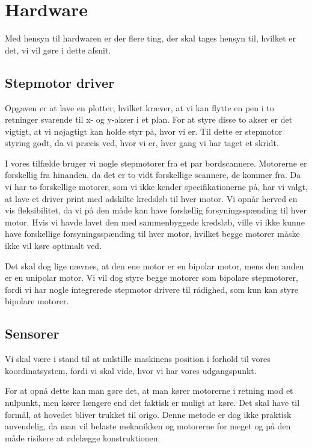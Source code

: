 \chapter[Design af hardware]{Hardware}
\label{ch:d-hardware}


Med hensyn til hardwaren er der flere ting, der skal tages hensyn
til, hvilket er det, vi vil gøre i dette afsnit.

\section{Stepmotor driver}
Opgaven er at lave en plotter, hvilket kræver, at vi kan flytte en pen
i to retninger svarende til x- og y-akser i et plan. For at styre
disse to akser er det vigtigt, at vi nøjagtigt kan holde styr på, hvor vi
er. Til dette er stepmotor styring godt, da vi præcis ved, hvor vi er,
hver gang vi har taget et skridt.

I vores tilfælde bruger vi nogle stepmotorer fra et par
bordscannere. Motorerne er forskellig fra hinanden, da det er to vidt
forskellige scannere, de kommer fra. Da vi har to forskellige motorer,
som vi ikke kender specifikationerne på, har vi valgt, at lave et
driver print med adskilte kredsløb til hver motor. Vi opnår herved en
vis fleksibilitet, da vi på den måde kan have forskellig
forsyningsspænding til hver motor. Hvis vi havde lavet den med
sammenbyggede kredsløb, ville vi ikke kunne have forskellige
forsyningsspænding til hver motor, hvilket begge motorer måske ikke
vil køre optimalt ved.

Det skal dog lige nævnes, at den ene motor er en bipolar motor, mens
den anden er en unipolar motor. Vi vil dog styre begge motorer som
bipolare stepmotorer, fordi vi har nogle integrerede stepmotor
drivere til rådighed, som kun kan styre bipolare motorer.

\section{Sensorer}
Vi skal være i stand til at nulstille maskinens position i forhold til
vores koordinatsystem, fordi vi skal vide, hvor vi har vores
udgangspunkt.

For at opnå dette kan man gøre det, at man kører motorerne i retning
mod et nulpunkt, men kører længere end det faktisk er muligt at
køre. Det skal have til formål, at hovedet bliver trukket til
origo. Denne metode er dog ikke praktisk anvendelig, da man vil belaste
mekanikken og motorerne for meget og på den måde risikere at ødelægge
konstruktionen.

